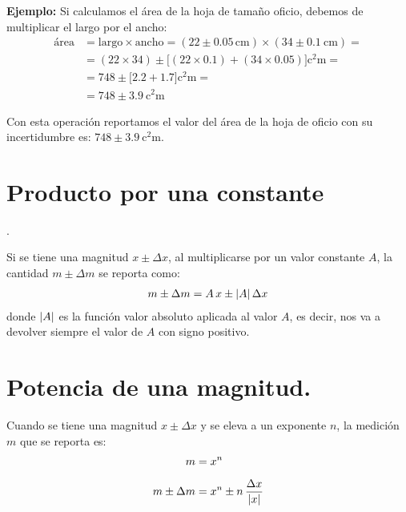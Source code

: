 \documentclass[14pt]{extarticle}
\begin{document}
\vspace*{0.5cm}
\noindent
\textbf{Ejemplo: } Si calculamos el área de la hoja de tamaño oficio, debemos de multiplicar el largo por el ancho:
\begin{align*}
\text{área} &= \text{largo} \times \text{ancho} = (\num{22} \pm \num{0.05} \, \unit{\centi\meter}) \times (\num{34} \pm \SI{0.1}{\centi\meter}) = \\[0.5em]
&= (22 \times 34) \pm \big[ (\num{22} \times \num{0.1}) + (\num{34}  \times \num{0.05}) \big] \unit{\square\centi\meter} = \\[0.5em]
&= \num{748} \pm \big[ \num{2.2} + \num{1.7} \big] \unit{\square\centi\meter} = \\[0.5em]
&= \num{748} \pm \SI{3.9}{\square\centi\meter}
\end{align*}

\noindent
Con esta operación reportamos el valor del área de la hoja de oficio con su incertidumbre es: $\num{748} \pm \SI{3.9}{\square\centi\meter}$.


\section{Producto por una constante}.

Si se tiene una magnitud $x\pm \Delta x$, al multiplicarse por un valor constante $A$, la cantidad $m \pm \Delta m$ se reporta como:
\begin{align*}
m \pm \Delta m = A \, x \pm \abs{A} \, \Delta x
\end{align*}
donde $\abs{A}$ es la función valor absoluto aplicada al valor $A$, es decir, nos va a devolver siempre el valor de $A$ con signo positivo.

\section{Potencia de una magnitud.}

Cuando se tiene una magnitud $x \pm \Delta x$ y se eleva a un exponente $n$, la medición $m$ que se reporta es:
\begin{align*}
m &= x^{n} \\[0.5em]
m \pm \Delta m &= x^{n} \pm n \, \dfrac{\Delta x}{\abs{x}}
\end{align*}
\end{document}
